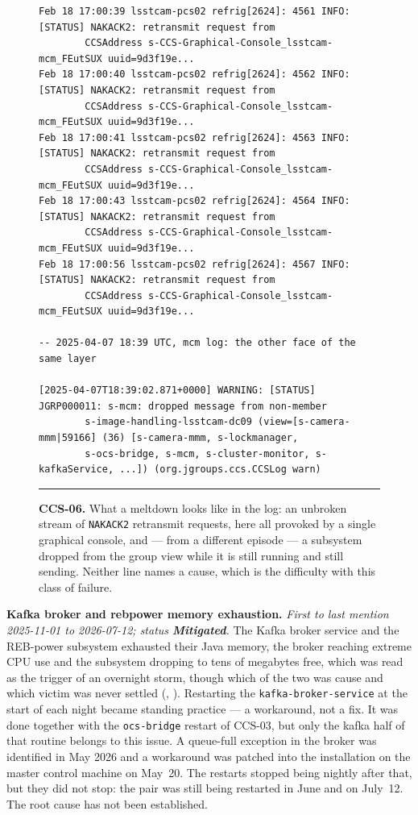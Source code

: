 \begin{description}
\begin{figure}[H]
\begin{minipage}{\textwidth}
\begin{verbatim}
Feb 18 17:00:39 lsstcam-pcs02 refrig[2624]: 4561 INFO: [STATUS] NAKACK2: retransmit request from
        CCSAddress s-CCS-Graphical-Console_lsstcam-mcm_FEutSUX uuid=9d3f19e...
Feb 18 17:00:40 lsstcam-pcs02 refrig[2624]: 4562 INFO: [STATUS] NAKACK2: retransmit request from
        CCSAddress s-CCS-Graphical-Console_lsstcam-mcm_FEutSUX uuid=9d3f19e...
Feb 18 17:00:41 lsstcam-pcs02 refrig[2624]: 4563 INFO: [STATUS] NAKACK2: retransmit request from
        CCSAddress s-CCS-Graphical-Console_lsstcam-mcm_FEutSUX uuid=9d3f19e...
Feb 18 17:00:43 lsstcam-pcs02 refrig[2624]: 4564 INFO: [STATUS] NAKACK2: retransmit request from
        CCSAddress s-CCS-Graphical-Console_lsstcam-mcm_FEutSUX uuid=9d3f19e...
Feb 18 17:00:56 lsstcam-pcs02 refrig[2624]: 4567 INFO: [STATUS] NAKACK2: retransmit request from
        CCSAddress s-CCS-Graphical-Console_lsstcam-mcm_FEutSUX uuid=9d3f19e...

-- 2025-04-07 18:39 UTC, mcm log: the other face of the same layer

[2025-04-07T18:39:02.871+0000] WARNING: [STATUS] JGRP000011: s-mcm: dropped message from non-member
        s-image-handling-lsstcam-dc09 (view=[s-camera-mmm|59166] (36) [s-camera-mmm, s-lockmanager,
        s-ocs-bridge, s-mcm, s-cluster-monitor, s-kafkaService, ...]) (org.jgroups.ccs.CCSLog warn)
\end{verbatim}
\endgroup
\vspace{-10pt}\hrule
\end{minipage}
\caption{\textbf{CCS-06.} What a meltdown looks like in the log: an unbroken stream of \texttt{NAKACK2} retransmit requests, here all provoked by a single graphical console, and --- from a different episode --- a subsystem dropped from the group view while it is still running and still sending.  Neither line names a cause, which is the difficulty with this class of failure.}
\label{fig:iss-CCS-06}
\end{figure}

\item[CCS-07]\label{iss:CCS-07} \textbf{Kafka broker and rebpower memory exhaustion.}
  \emph{First to last mention 2025-11-01 to 2026-07-12; status \textcolor{stmit}{\textbf{Mitigated}}.}
  The Kafka broker service and the REB-power subsystem exhausted their Java memory, the broker reaching extreme CPU use and the subsystem dropping to tens of megabytes free, which was read as the trigger of an overnight storm, though which of the two was cause and which victim was never settled (, ).  Restarting the \texttt{kafka-broker-service} at the start of each night became standing practice --- a workaround, not a fix.  It was done together with the \texttt{ocs-bridge} restart of CCS-03, but only the kafka half of that routine belongs to this issue.  A queue-full exception in the broker was identified in May 2026 and a workaround was patched into the installation on the master control machine on May~20.  The restarts stopped being nightly after that, but they did not stop: the pair was still being restarted in June and on July~12.  The root cause has not been established.


\end{description}
